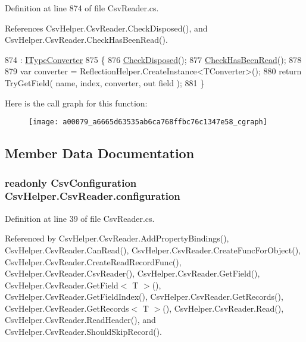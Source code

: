 Definition at line 874 of file Csv\-Reader.\-cs.



References Csv\-Helper.\-Csv\-Reader.\-Check\-Disposed(), and Csv\-Helper.\-Csv\-Reader.\-Check\-Has\-Been\-Read().


\begin{DoxyCode}
874                                                                                                            
          : \hyperlink{a00125}{ITypeConverter}
875         \{
876             \hyperlink{a00079_a6fa45a46ed1322dc1872ca2321b5edbc}{CheckDisposed}();
877             \hyperlink{a00079_a2d9249171ed1568e45d152766d364c31}{CheckHasBeenRead}();
878 
879             var converter = ReflectionHelper.CreateInstance<TConverter>();
880             \textcolor{keywordflow}{return} TryGetField( name, index, converter, out field );
881         \}
\end{DoxyCode}


Here is the call graph for this function\-:
\nopagebreak
\begin{figure}[H]
\begin{center}
\leavevmode
\texttt{[image: a00079\_a6665d63535ab6ca768ffbc76c1347e58\_cgraph]}
\end{center}
\end{figure}




\subsection{Member Data Documentation}
\hypertarget{a00079_a695622911e45cbac8d67dcbd9a3e2967}{
\subsubsection[{configuration}]{\setlength{\rightskip}{0pt plus 5cm}readonly {\bf Csv\-Configuration} Csv\-Helper.\-Csv\-Reader.\-configuration\hspace{0.3cm}{\ttfamily [private]}}}\label{a00079_a695622911e45cbac8d67dcbd9a3e2967}


Definition at line 39 of file Csv\-Reader.\-cs.



Referenced by Csv\-Helper.\-Csv\-Reader.\-Add\-Property\-Bindings(), Csv\-Helper.\-Csv\-Reader.\-Can\-Read(), Csv\-Helper.\-Csv\-Reader.\-Create\-Func\-For\-Object(), Csv\-Helper.\-Csv\-Reader.\-Create\-Read\-Record\-Func(), Csv\-Helper.\-Csv\-Reader.\-Csv\-Reader(), Csv\-Helper.\-Csv\-Reader.\-Get\-Field(), Csv\-Helper.\-Csv\-Reader.\-Get\-Field$<$ T $>$(), Csv\-Helper.\-Csv\-Reader.\-Get\-Field\-Index(), Csv\-Helper.\-Csv\-Reader.\-Get\-Records(), Csv\-Helper.\-Csv\-Reader.\-Get\-Records$<$ T $>$(), Csv\-Helper.\-Csv\-Reader.\-Read(), Csv\-Helper.\-Csv\-Reader.\-Read\-Header(), and Csv\-Helper.\-Csv\-Reader.\-Should\-Skip\-Record().

